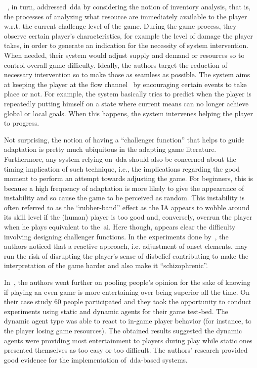 ~\cite{hunicke_ai_2004}, in turn, addressed~\gls{dda} by considering the notion of inventory analysis, that is, the processes of analyzing what resource are immediately available to the player w.r.t. the current challenge level of the game. During the game process, they observe certain player's characteristics, for example the level of damage the player takes, in order to generate an indication for the necessity of system intervention. When needed, their system would adjust supply and demand or resources so to control overall game difficulty. Ideally, the authors target the reduction of necessary intervention so to make those as seamless as possible. The system aims at keeping the player at the flow channel~\citep{csikszentmihalyi_flow:_1991} by encouraging certain events to take place or not. For example, the system basically tries to predict when the player is repeatedly putting himself on a state where current means can no longer achieve global or local goals.%
When this happens, the system intervenes helping the player to progress.

Not surprising, the notion of having a ``challenger function'' that helps to guide adaptation is pretty much ubiquitous in the adapting game literature. Furthermore, any system relying on~\gls{dda} should also be concerned about the timing implication of such technique, i.e., the implications regarding the good moment to perform an attempt towards adjusting the game. For beginners, this is because a high frequency of adaptation is more likely to give the appearance of instability and so cause the game to be perceived as random. This instability is often referred to as the ``rubber-band'' effect as the IA appears to wobble around its skill level if the (human) player is too good and, conversely, overrun the player when he plays equivalent to the~\gls{ai}. Here though, appears clear the difficulty involving designing challenger functions. In the experiments done by~\cite{hunicke_ai_2004}, the authors noticed that a reactive approach, i.e. adjustment of onset elements, may run the risk of disrupting the player's sense of disbelief contributing to make the interpretation of the game harder and also make it ``schizophrenic''.

In~\cite{hagelback_measuring_2009}, the authors went further on pooling people's opinion for the sake of knowing if playing an even game is more entertaining over being superior all the time. On their case study 60 people participated and they took the opportunity to conduct experiments using static and dynamic agents for their game test-bed. The dynamic agent type was able to react to in-game player behavior (for instance, to the player losing game resources). The obtained results suggested the dynamic agents were providing most entertainment to players during play while static ones presented themselves as too easy or too difficult. The authors' research provided good evidence for the implementation of~\gls{dda}-based systems.%

